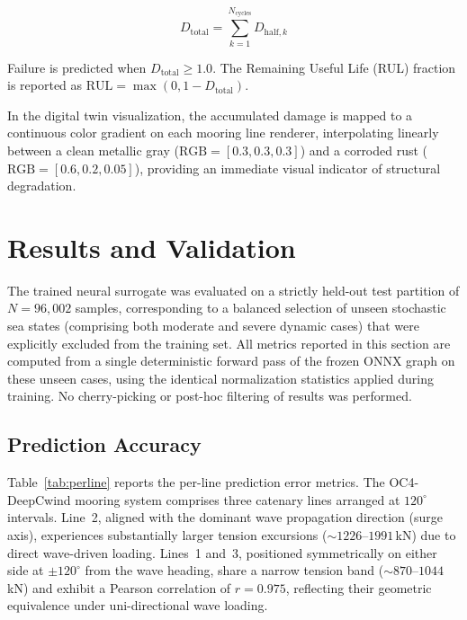 \documentclass[preprint,12pt]{elsarticle}
\begin{document}
\begin{equation}
\label{eq:total_damage}
    D_{\text{total}} = \sum_{k=1}^{N_{\text{cycles}}} D_{\text{half},k}
\end{equation}

\noindent Failure is predicted when $D_{\text{total}} \geq 1.0$. The Remaining Useful Life (RUL) fraction is reported as $\text{RUL} = \max(0, 1 - D_{\text{total}})$.

In the digital twin visualization, the accumulated damage is mapped to a continuous color gradient on each mooring line renderer, interpolating linearly between a clean metallic gray ($\text{RGB} = [0.3, 0.3, 0.3]$) and a corroded rust ($\text{RGB} = [0.6, 0.2, 0.05]$), providing an immediate visual indicator of structural degradation.

\section{Results and Validation}
\label{sec:results}

The trained neural surrogate was evaluated on a strictly held-out test partition of $N = 96,002$ samples, corresponding to a balanced selection of unseen stochastic sea states (comprising both moderate and severe dynamic cases) that were explicitly excluded from the training set. All metrics reported in this section are computed from a single deterministic forward pass of the frozen ONNX graph on these unseen cases, using the identical normalization statistics applied during training. No cherry-picking or post-hoc filtering of results was performed.

\subsection{Prediction Accuracy}
\label{sec:accuracy}

Table~\ref{tab:perline} reports the per-line prediction error metrics. The OC4-DeepCwind mooring system comprises three catenary lines arranged at $120^\circ$ intervals. Line~2, aligned with the dominant wave propagation direction (surge axis), experiences substantially larger tension excursions (${\sim}1226$--$1991$\,kN) due to direct wave-driven loading. Lines~1 and~3, positioned symmetrically on either side at $\pm 120^\circ$ from the wave heading, share a narrow tension band (${\sim}870$--$1044$\,kN) and exhibit a Pearson correlation of $r = 0.975$, reflecting their geometric equivalence under uni-directional wave loading.
\end{document}
